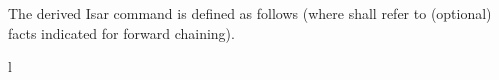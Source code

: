 \begin{isabellebody}
\begin{isamarkuptext}
  The derived Isar command \hyperlink{command.obtain}{\mbox{}} is defined as follows
  (where  shall refer to (optional)
  facts indicated for forward chaining).
  \begin{matharray}{l}
    ~~\hyperlink{command.obtain}{\mbox{}}~ \\[1ex]
    \quad \hyperlink{command.have}{\mbox{}}~ \\
    \quad \hyperlink{command.proof}{\mbox{}}~\hyperlink{method.succeed}{\mbox{}} \\
    \qquad \hyperlink{command.fix}{\mbox{}}~ \\
    \qquad \hyperlink{command.assume}{\mbox{}}~ \\
    \qquad \hyperlink{command.then}{\mbox{}}~\hyperlink{command.show}{\mbox{}}~ \\
    \quad\qquad \hyperlink{command.apply}{\mbox{}}~\isa{{\isacharminus}} \\
    \quad\qquad \hyperlink{command.using}{\mbox{}}~ \\

\end{matharray}
\end{isamarkuptext}
\end{isabellebody}
